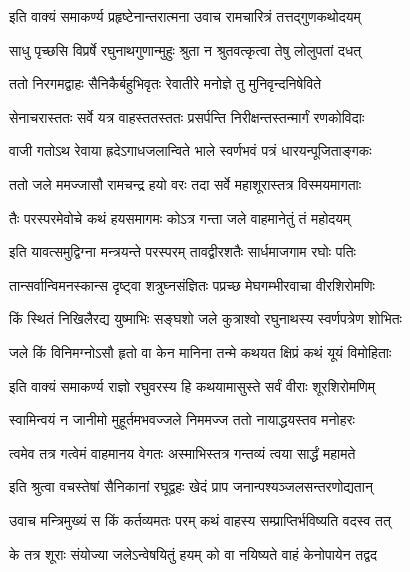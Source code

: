 
\twolineshloka
{इति वाक्यं समाकर्ण्य प्रहृष्टेनान्तरात्मना}
{उवाच रामचारित्रं तत्तद्गुणकथोदयम्}%


\twolineshloka
{साधु पृच्छसि विप्रर्षे रघुनाथगुणान्मुहुः}
{श्रुता न श्रुतवत्कृत्वा तेषु लोलुपतां दधत्}%

\twolineshloka
{ततो निरगमद्वाहः सैनिकैर्बहुभिवृतः}
{रेवातीरे मनोज्ञे तु मुनिवृन्दनिषेविते}%

\twolineshloka
{सेनाचरास्ततः सर्वे यत्र वाहस्ततस्ततः}
{प्रसर्पन्ति निरीक्षन्तस्तन्मार्गं रणकोविदाः}%

\twolineshloka
{वाजी गतोऽथ रेवाया ह्रदेऽगाधजलान्विते}
{भाले स्वर्णभवं पत्रं धारयन्पूजिताङ्गकः}%

\twolineshloka
{ततो जले ममज्जासौ रामचन्द्र हयो वरः}
{तदा सर्वे महाशूरास्तत्र विस्मयमागताः}%

\twolineshloka
{तैः परस्परमेवोचे कथं हयसमागमः}
{कोऽत्र गन्ता जले वाहमानेतुं तं महोदयम्}%

\twolineshloka
{इति यावत्समुद्विग्ना मन्त्रयन्ते परस्परम्}
{तावद्वीरशतैः सार्धमाजगाम रघोः पतिः}%

\twolineshloka
{तान्सर्वान्विमनस्कान्स दृष्ट्वा शत्रुघ्नसंज्ञितः}
{पप्रच्छ मेघगम्भीरवाचा वीरशिरोमणिः}%

\twolineshloka
{किं स्थितं निखिलैरद्य युष्माभिः सङ्घशो जले}
{कुत्राश्वो रघुनाथस्य स्वर्णपत्रेण शोभितः}%

\twolineshloka
{जले किं विनिमग्नोऽसौ हृतो वा केन मानिना}
{तन्मे कथयत क्षिप्रं कथं यूयं विमोहिताः}%


\twolineshloka
{इति वाक्यं समाकर्ण्य राज्ञो रघुवरस्य हि}
{कथयामासुस्ते सर्वं वीराः शूरशिरोमणिम्}%


\twolineshloka
{स्वामिन्वयं न जानीमो मुहूर्तमभवज्जले}
{निममज्ज ततो नायाद्धयस्तव मनोहरः}%

\twolineshloka
{त्वमेव तत्र गत्वेमं वाहमानय वेगतः}
{अस्माभिस्तत्र गन्तव्यं त्वया सार्द्धं महामते}%

\twolineshloka
{इति श्रुत्वा वचस्तेषां सैनिकानां रघूद्वहः}
{खेदं प्राप जनान्पश्यञ्जलसन्तरणोद्यतान्}%

\twolineshloka
{उवाच मन्त्रिमुख्यं स किं कर्तव्यमतः परम्}
{कथं वाहस्य सम्प्राप्तिर्भविष्यति वदस्व तत्}%

\twolineshloka
{के तत्र शूराः संयोज्या जलेऽन्वेषयितुं हयम्}
{को वा नयिष्यते वाहं केनोपायेन तद्वद}%

